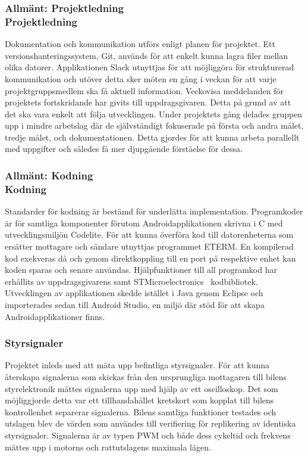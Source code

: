 \documentclass[a4paper]{article}
\begin{document}
\subsubsection{Allmänt: Projektledning \\ Projektledning}
Dokumentation och kommunikation utförs enligt planen för projektet. Ett versionshanteringssystem, Git, används för att enkelt kunna lagra filer mellan olika datorer. Applikationen Slack utnyttjas för att möjliggöra för strukturerad kommunikation och utöver detta sker möten en gång i veckan för att varje projektgruppsmedlem ska få aktuell information. Veckovisa meddelanden för projektets fortskridande har givits till uppdragsgivaren. Detta på grund av att det ska vara enkelt att följa utvecklingen. Under projektets gång delades gruppen upp i mindre arbetslag där de självständigt fokuserade på första och andra målet, tredje målet, och dokumentationen. Detta gjordes för att kunna arbeta parallellt med uppgifter och således få mer djupgående förståelse för dessa.

\subsubsection{Allmänt: Kodning \\ Kodning}
Standarder för kodning är bestämd för underlätta implementation. Programkoder är för samtliga komponenter förutom Androidapplikationen skrivna i C med utvecklingsmiljön Codelite. För att kunna överföra kod till datorenheterna som ersätter mottagare och sändare utnyttjas programmet ETERM. En kompilerad kod exekveras då och genom direktkoppling till en port på respektive enhet kan koden sparas och senare användas. Hjälpfunktioner till all programkod har erhållits av uppdragsgivarens samt STMicroelectronics~\cite{STM} kodbibliotek. Utvecklingen av applikationen skedde istället i Java genom Eclipse och importerades sedan till Android Studio, en miljö där stöd för att skapa Androidapplikationer finns.




\subsubsection{Styrsignaler}
Projektet inleds med att mäta upp befintliga styrsignaler. För att kunna återskapa signalerna som skickas från den ursprungliga mottagaren till bilens styrelektronik mättes signalerna upp med hjälp av ett oscilloskop. Det som möjliggjorde detta var ett tillhandahållet kretskort som kopplat till bilens kontrollenhet separerar signalerna. Bilens samtliga funktioner testades och utslagen blev de värden som användes till verifiering för replikering av identiska styrsignaler. Signalerna är av typen PWM och både dess cykeltid och frekvens mättes upp i motorns och rattutslagens maximala lägen. 
\end{document}
